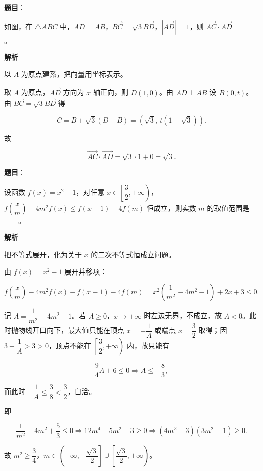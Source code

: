 \begin{answer}

\textbf{题目}：

如图，在 $\triangle ABC$ 中，$AD\perp AB$，$\overrightarrow{BC}=\sqrt3\overrightarrow{BD}$，$|\overrightarrow{AD}|=1$，则 $\overrightarrow{AC}\cdot\overrightarrow{AD}=$ $\underline{\qquad}$。
\nopagebreak[4]
\begin{center}\end{center}
\nopagebreak[4]
\textbf{解析}

以 $A$ 为原点建系，把向量用坐标表示。

取 $A$ 为原点，$\overrightarrow{AD}$ 方向为 $x$ 轴正向，则 $D(1,0)$。由 $AD\perp AB$ 设 $B(0,t)$。由 $\overrightarrow{BC}=\sqrt3\overrightarrow{BD}$ 得

\nopagebreak[4]
\[C=B+\sqrt3(D-B)=(\sqrt3,\ t(1-\sqrt3)).\]

故

\nopagebreak[4]
\[\overrightarrow{AC}\cdot\overrightarrow{AD}=\sqrt3\cdot1+0=\sqrt3.\]


\end{answer}
\begin{answer}

\textbf{题目}：

设函数 $f(x)=x^2-1$，对任意 $x\in\left[\dfrac32,+\infty\right)$，$f\left(\dfrac xm\right)-4m^2f(x)\leqslant f(x-1)+4f(m)$ 恒成立，则实数 $m$ 的取值范围是$\underline{\qquad}$。

\textbf{解析}

把不等式展开，化为关于 $x$ 的二次不等式恒成立问题。

由 $f(x)=x^2-1$ 展开并移项：

\nopagebreak[4]
\[f\left(\frac xm\right)-4m^2f(x)-f(x-1)-4f(m)
=x^2\left(\frac1{m^2}-4m^2-1\right)+2x+3\leqslant0.\]

记 $A=\dfrac1{m^2}-4m^2-1$。若 $A\geqslant0$，$x\to+\infty$ 时左边无界，不成立，故 $A<0$。此时抛物线开口向下，最大值只能在顶点 $x=-\dfrac1A$ 或端点 $x=\dfrac32$ 取得；因 $3-\dfrac1A>3>0$，顶点不能在 $\left[\dfrac32,+\infty\right)$ 内，故只能有

\nopagebreak[4]
\[\frac94A+6\leqslant0\Longrightarrow A\leqslant-\frac83,\]

而此时 $-\dfrac1A\leqslant\dfrac38<\dfrac32$，自洽。

即

\nopagebreak[4]
\[\frac1{m^2}-4m^2+\frac53\leqslant0
\Longrightarrow 12m^4-5m^2-3\geqslant0
\Longrightarrow (4m^2-3)(3m^2+1)\geqslant0.\]

故 $m^2\geqslant\dfrac34$，$m\in\left(-\infty,-\dfrac{\sqrt3}2\right]\cup\left[\dfrac{\sqrt3}2,+\infty\right)$。

\gkanswer{答案：$\left(-\infty,-\dfrac{\sqrt3}2\right]\cup\left[\dfrac{\sqrt3}2,+\infty\right)$。}

\end{answer}
